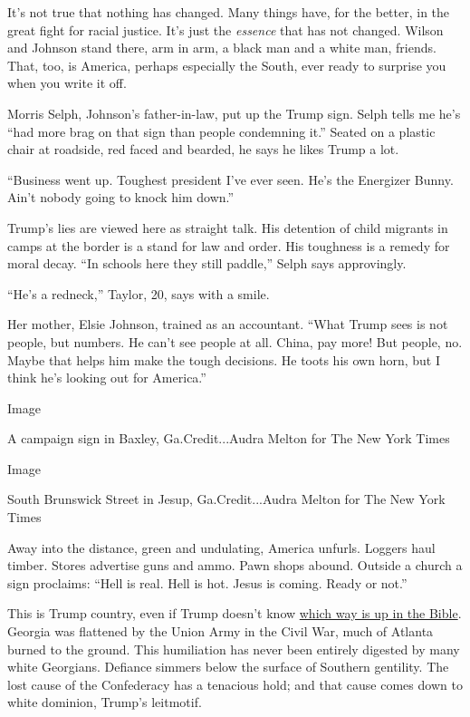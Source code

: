 It's not true that nothing has changed. Many things have, for the
better, in the great fight for racial justice. It's just the
\emph{essence} that has not changed. Wilson and Johnson stand there, arm
in arm, a black man and a white man, friends. That, too, is America,
perhaps especially the South, ever ready to surprise you when you write
it off.

Morris Selph, Johnson's father-in-law, put up the Trump sign. Selph
tells me he's ``had more brag on that sign than people condemning it.''
Seated on a plastic chair at roadside, red faced and bearded, he says he
likes Trump a lot.

``Business went up. Toughest president I've ever seen. He's the
Energizer Bunny. Ain't nobody going to knock him down.''

Trump's lies are viewed here as straight talk. His detention of child
migrants in camps at the border is a stand for law and order. His
toughness is a remedy for moral decay. ``In schools here they still
paddle,'' Selph says approvingly.

``He's a redneck,'' Taylor, 20, says with a smile.

Her mother, Elsie Johnson, trained as an accountant. ``What Trump sees
is not people, but numbers. He can't see people at all. China, pay more!
But people, no. Maybe that helps him make the tough decisions. He toots
his own horn, but I think he's looking out for America.''

Image

A campaign sign in Baxley, Ga.Credit...Audra Melton for The New York
Times

Image

South Brunswick Street in Jesup, Ga.Credit...Audra Melton for The New
York Times

Away into the distance, green and undulating, America unfurls. Loggers
haul timber. Stores advertise guns and ammo. Pawn shops abound. Outside
a church a sign proclaims: ``Hell is real. Hell is hot. Jesus is coming.
Ready or not.''

This is Trump country, even if Trump doesn't know
\href{https://www.facebook.com/watch/?v=10153577166571880}{which way is
up in the Bible}. Georgia was flattened by the Union Army in the Civil
War, much of Atlanta burned to the ground. This humiliation has never
been entirely digested by many white Georgians. Defiance simmers below
the surface of Southern gentility. The lost cause of the Confederacy has
a tenacious hold; and that cause comes down to white dominion, Trump's
leitmotif.


